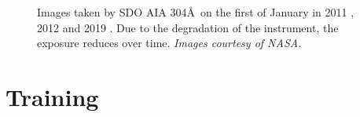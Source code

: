 \documentclass[11pt,a4paper,onecolumn]{report}
\begin{document}
\begin{figure}[t]%
  \centering
  \qquad
  \qquad
  \caption[]{Images taken by SDO AIA 304\AA \ on the first of January in 2011
    , 2012  and 2019
    . Due to the degradation of the instrument, the
    exposure reduces over time. \textit{Images courtesy of NASA.}}
  \label{fig:aia_degradation}
\end{figure}



















%
%
%
%
%
%
%
%
\chapter{Training}
%
%
%
%
%
%
%
%
\end{document}
